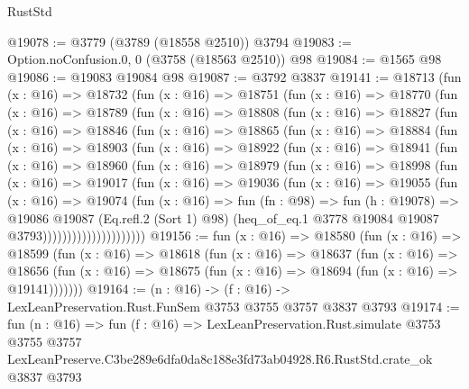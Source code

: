 \begin{lexlean}{RustStd}
\begin{coremodule}
@19078 := @3779 (@3789 (@18558 @2510)) @3794
@19083 := Option.noConfusion.{0, 0} (@3758 (@18563 @2510)) @98
@19084 := @1565 @98
@19086 := @19083 @19084 @98
@19087 := @3792 @3837
@19141 := @18713
    (fun (x : @16) =>
    @18732
      (fun (x : @16) =>
      @18751
        (fun (x : @16) =>
        @18770
          (fun (x : @16) =>
          @18789
            (fun (x : @16) =>
            @18808
              (fun (x : @16) =>
              @18827
                (fun (x : @16) =>
                @18846
                  (fun (x : @16) =>
                  @18865
                    (fun (x : @16) =>
                    @18884
                      (fun (x : @16) =>
                      @18903
                        (fun (x : @16) =>
                        @18922
                          (fun (x : @16) =>
                          @18941
                            (fun (x : @16) =>
                            @18960
                              (fun (x : @16) =>
                              @18979
                                (fun (x : @16) =>
                                @18998
                                  (fun (x : @16) =>
                                  @19017
                                    (fun (x : @16) =>
                                    @19036
                                      (fun (x : @16) =>
                                      @19055
                                        (fun (x : @16) =>
                                        @19074
                                          (fun (x : @16) =>
                                          fun (fn : @98) =>
                                          fun (h : @19078) =>
                                          @19086
                                            @19087
                                            (Eq.refl.{2} (Sort 1) @98)
                                            (heq_of_eq.{1}
                                              @3778
                                              @19084
                                              @19087
                                              @3793)))))))))))))))))))))
@19156 := fun (x : @16) =>
  @18580
    (fun (x : @16) =>
    @18599
      (fun (x : @16) =>
      @18618
        (fun (x : @16) =>
        @18637
          (fun (x : @16) =>
          @18656 (fun (x : @16) => @18675 (fun (x : @16) => @18694 (fun (x : @16) => @19141)))))))
@19164 := (n : @16) -> (f : @16) -> LexLeanPreservation.Rust.FunSem @3753 @3755 @3757 @3837 @3793
@19174 := fun (n : @16) =>
  fun (f : @16) =>
  LexLeanPreservation.Rust.simulate
    @3753
    @3755
    @3757
    LexLeanPreserve.C3be289e6dfa0da8c188e3fd73ab04928.R6.RustStd.crate_ok
    @3837
    @3793
\end{coremodule}
\end{lexlean}
